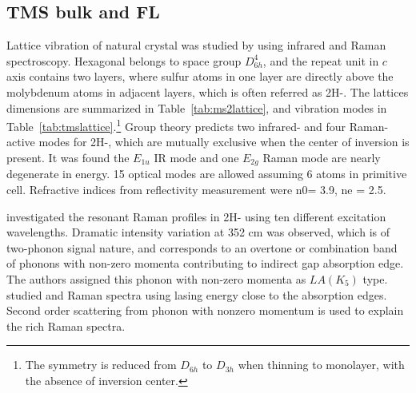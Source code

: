 \subsection{TMS bulk and FL}


Lattice vibration of natural  crystal was studied by \citeauthor{Wieting1971} using infrared and Raman spectroscopy.\cite{Wieting1971} Hexagonal  belongs to space group $D_{6h}^4$, and the repeat unit in $c$ axis contains two layers, where sulfur atoms in one layer are directly above the molybdenum atoms in adjacent layers, which is often referred as 2H-. The lattices dimensions are summarized in Table~\ref{tab:ms2lattice}, and vibration modes in Table~\ref{tab:tmslattice}.\footnote{The symmetry is reduced from $D_{6h}$ to $D_{3h}$ when thinning to monolayer, with the absence of inversion center.} Group theory predicts two infrared- and four Raman-active modes for 2H-, which are mutually exclusive when the center of inversion is present. It was found the $E_{1u}$ IR mode and one $E_{2g}$ Raman mode are nearly degenerate in energy. 15 optical modes are allowed assuming 6 atoms in primitive cell. Refractive indices from reflectivity measurement were n0= 3.9, ne = 2.5.

\citeauthor{Sourisseau1991} investigated the resonant Raman profiles in 2H- using ten different excitation wavelengths.\cite{Sourisseau1991} Dramatic intensity variation at 352 cm was observed, which is of two-phonon signal nature, and corresponds to an overtone or combination band of phonons with non-zero momenta contributing to indirect gap absorption edge. The authors assigned this phonon with non-zero momenta as $LA(K_5)$ type. \citeauthor{Stacy1985} studied  and  Raman spectra using lasing energy close to the absorption edges.\cite{Stacy1985} Second order scattering from phonon with nonzero momentum is used to explain the rich Raman spectra.


